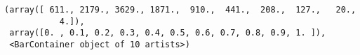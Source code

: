 \documentclass[11pt]{article}
\makeatletter
\newcommand{\boxspacing}{\kern\kvtcb@left@rule\kern\kvtcb@boxsep}
\newcommand{\prompt}[4]{
        {\ttfamily\llap{{\color{#2}[#3]:\hspace{3pt}#4}}\vspace{-\baselineskip}}
    }
\makeatother
\begin{document}
            \begin{tcolorbox}[breakable, size=fbox, boxrule=.5pt, pad at break*=1mm, opacityfill=0]
\prompt{Out}{outcolor}{109}{\boxspacing}
\begin{Verbatim}[commandchars=\\\{\}]
(array([ 611., 2179., 3629., 1871.,  910.,  441.,  208.,  127.,   20.,
           4.]),
 array([0. , 0.1, 0.2, 0.3, 0.4, 0.5, 0.6, 0.7, 0.8, 0.9, 1. ]),
 <BarContainer object of 10 artists>)
\end{Verbatim}
\end{tcolorbox}
        
    \begin{center}
    \end{center}
    { \hspace*{\fill} \\}
    
\end{document}
